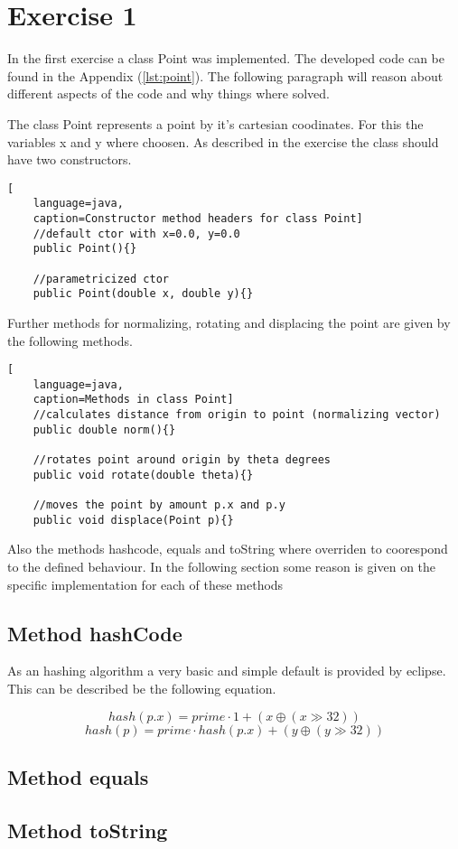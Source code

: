 \chapter{Exercise 1}

In the first exercise a class Point was implemented. The developed code can be found in the Appendix (\ref{lst:point}). The following paragraph will reason about different aspects of the code and why things where solved.

The class Point represents a point by it's cartesian coodinates. For this the variables x and y where choosen. As described in the exercise the class should have two constructors.

\begin{lstlisting}[
    language=java,
    caption=Constructor method headers for class Point]
    //default ctor with x=0.0, y=0.0
    public Point(){}

    //parametricized ctor
    public Point(double x, double y){}
\end{lstlisting}

Further methods for normalizing, rotating and displacing the point are given by the following methods.

\begin{lstlisting}[
    language=java,
    caption=Methods in class Point]
    //calculates distance from origin to point (normalizing vector)
    public double norm(){}

    //rotates point around origin by theta degrees
    public void rotate(double theta){}

    //moves the point by amount p.x and p.y
    public void displace(Point p){}
\end{lstlisting}

Also the methods hashcode, equals and toString where overriden to coorespond to the defined behaviour. In the following section some reason is given on the specific implementation for each of these methods

\section{Method hashCode}
As an hashing algorithm a very basic and simple default is provided by eclipse. This can be described be the following equation.

\begin{displaymath}
    hash(p.x) = prime \cdot 1 + (x \oplus (x \gg 32))
\end{displaymath}
\begin{displaymath}
    hash(p) = prime \cdot hash(p.x) + (y \oplus (y \gg 32))
\end{displaymath}

\section{Method equals}

\section{Method toString}


